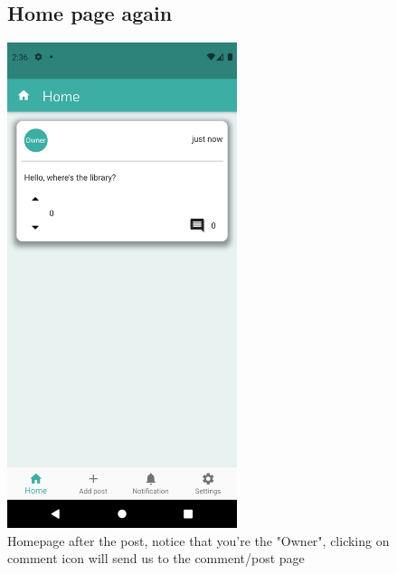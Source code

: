 \documentclass[12pt]{article}
\begin{document}
  \begin{figure}[h!]
\vspace{-2cm}
  \subsection*{Home page again}
\centerline{\includegraphics[width=0.6\textwidth]{./Screenshots/13.PNG}}
  \caption{Homepage after the post, notice that you're the "Owner", clicking on comment icon will send us to the comment/post page}
  \end{figure}
\end{document}

